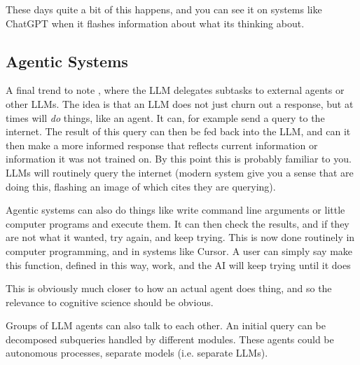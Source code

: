 
These days quite a bit of this happens, and you can see it on systems like
ChatGPT when it flashes information about what its thinking about.
 

\subsection{Agentic Systems}


A final trend to note , where the LLM delegates
subtasks to external agents or other LLMs. The idea is that an LLM does not
just churn out a response, but at times will \emph{do} things, like an agent.
It can, for example send a query to the internet. The result of this query can
then be fed back into the LLM, and can it then make a more informed response
that reflects current information or information it was not trained on. By this
point this is probably familiar to you.  LLMs will routinely query the internet
(modern system give you a sense that are doing this, flashing an image of which
cites they are querying).  

Agentic systems can also do things like write command line arguments or little
computer programs and execute them. It can then check the results, and if they
are not what it wanted, try again, and keep trying. This is now done routinely
in computer programming, and in systems like Cursor.  A user can simply say
make this function, defined in this way, work, and the AI will keep trying
until it does

This is obviously much closer to how an actual agent does thing, and so the
relevance to cognitive science should be obvious.

Groups of LLM agents can also talk to each other.  An initial query can be
decomposed  subqueries handled by different modules. These agents could be
autonomous processes, separate models (i.e. separate LLMs).

